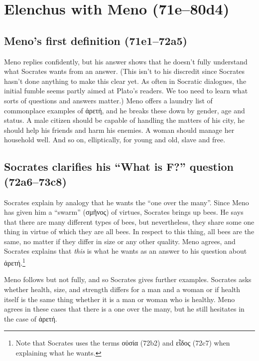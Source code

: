 \documentclass[11pt]{article}
\begin{document}
\section{Elenchus with Meno (71e--80d4)}

\subsection{Meno's first definition (71e1--72a5)}

Meno replies confidently, but his answer shows that he doesn't fully understand what Socrates wants from an answer. (This isn't to his discredit since Socrates hasn't done anything to make this clear yet. As often in Socratic dialogues, the initial fumble seems partly aimed at Plato's readers. We too need to learn what sorts of questions and answers matter.) Meno offers a laundry list of commonplace examples of {\g ἀρετή}, and he breaks these down by gender, age and status. A male citizen should be capable of handling the matters of his city, he should help his friends and harm his enemies. A woman should manage her household well. And so on, elliptically, for young and old, slave and free.

\subsection{Socrates clarifies his ``What is F?'' question (72a6--73c8)}

Socrates explain by analogy that he wants the ``one over the many''. Since Meno has given him a ``swarm'' ({\g σμῆνος}) of virtues, Socrates brings up bees. He says that there are many different types of bees, but nevertheless, they share some one thing in virtue of which they are all bees. In respect to this thing, all bees are the same, no matter if they differ in size or any other quality. Meno agrees, and Socrates explains that \emph{this} is what he wants as an answer to his question about {\g ἀρετή}.\footnote{Note that Socrates uses the terms {\g οὐσία} (72b2) and {\g εἶδος} (72c7) when explaining what he wants.}

Meno follows but not fully, and so Socrates gives further examples. Socrates asks whether health, size, and strength differs for a man and a woman or if health itself is the same thing whether it is a man or woman who is healthy. Meno agrees in these cases that there is a one over the many, but he still hesitates in the case of {\g ἀρετή}.
\end{document}
